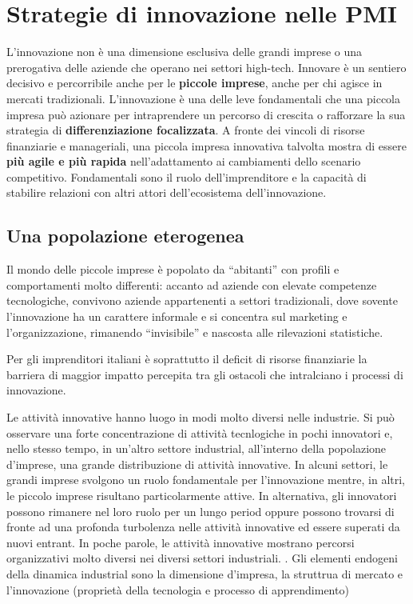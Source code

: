 \documentclass{article}
\begin{document}
\section{Strategie di innovazione nelle PMI}
L’innovazione non è una dimensione esclusiva delle grandi imprese o una
prerogativa delle aziende che operano nei settori high-tech.
Innovare è un sentiero decisivo e percorribile anche per le \textbf{piccole imprese},
anche per chi agisce in mercati tradizionali.
L’innovazione è una delle leve fondamentali che una piccola impresa può
azionare per intraprendere un percorso di crescita o rafforzare la sua
strategia di \textbf{differenziazione focalizzata}.
A fronte dei vincoli di risorse finanziarie e manageriali, una piccola
impresa innovativa talvolta mostra di essere\textbf{ più agile e più rapida}
nell’adattamento ai cambiamenti dello scenario competitivo.
Fondamentali sono il ruolo dell’imprenditore e la capacità di
stabilire relazioni con altri attori dell’ecosistema dell’innovazione.

\subsection{Una popolazione eterogenea}
Il mondo delle piccole imprese è popolato da “abitanti” con profili e
comportamenti molto differenti: accanto ad aziende con elevate
competenze tecnologiche, convivono aziende appartenenti a settori
tradizionali, dove sovente l’innovazione ha un carattere informale e si
concentra sul marketing e l’organizzazione, rimanendo “invisibile” e
nascosta alle rilevazioni statistiche.

Per gli imprenditori italiani è soprattutto il deficit di risorse finanziarie la
barriera di maggior impatto percepita tra gli ostacoli che intralciano i processi
di innovazione.

Le attività innovative hanno luogo in modi molto diversi nelle industrie. Si può
osservare una forte concentrazione di attività tecnlogiche in pochi innovatori e,
nello stesso tempo, in un’altro settore industrial, all’interno della popolazione
d’imprese, una grande distribuzione di attività innovative.
In alcuni settori, le grandi imprese svolgono un ruolo fondamentale per
l’innovazione mentre, in altri, le piccolo imprese risultano particolarmente attive.
In alternativa, gli innovatori possono rimanere nel loro ruolo per un lungo period
oppure possono trovarsi di fronte ad una profonda turbolenza nelle attività
innovative ed essere superati da nuovi entrant.
In poche parole, le attività innovative mostrano percorsi organizzativi molto
diversi nei diversi settori industriali.
.
Gli elementi endogeni della dinamica industrial sono la dimensione d’impresa, la
struttrua di mercato e l’innovazione (proprietà della tecnologia e processo di
apprendimento)
\end{document}
